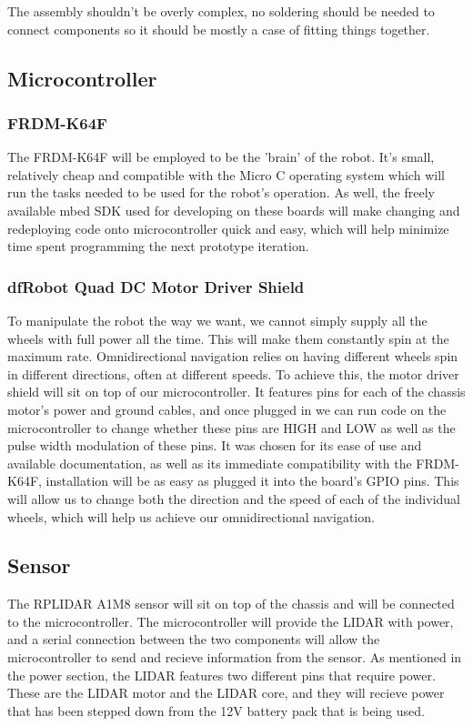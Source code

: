 			The assembly shouldn't be overly complex, no soldering should be needed to connect components so it should be mostly a case of fitting things together.
			
			
			
		\subsection{Microcontroller}
			\subsubsection{FRDM-K64F}
			The FRDM-K64F will be employed to be the 'brain' of the robot. It's small, relatively cheap and compatible with the Micro C operating system which will run the tasks needed to be used for the robot's operation. As well, the freely available mbed SDK used for developing on these boards will make changing and redeploying code onto microcontroller quick and easy, which will help minimize time spent programming the next prototype iteration.
			
			\subsubsection{dfRobot Quad DC Motor Driver Shield}
			To manipulate the robot the way we want, we cannot simply supply all the wheels with full power all the time. This will make them constantly spin at the maximum rate. Omnidirectional navigation relies on having different wheels spin in different directions, often at different speeds. To achieve this, the motor driver shield will sit on top of our microcontroller. It features pins for each of the chassis motor's power and ground cables, and once plugged in we can run code on the microcontroller to change whether these pins are HIGH and LOW as well as the pulse width modulation of these pins. It was chosen for its ease of use and available documentation, as well as its immediate compatibility with the FRDM-K64F, installation will be as easy as plugged it into the board's GPIO pins. This will allow us to change both the direction and the speed of each of the individual wheels, which will help us achieve our omnidirectional navigation.
		
		\subsection{Sensor}
		The RPLIDAR A1M8 sensor will sit on top of the chassis and will be connected to the microcontroller. The microcontroller will provide the LIDAR with power, and a serial connection between the two components will allow the microcontroller to send and recieve information from the sensor. As mentioned in the power section, the LIDAR features two different pins that require power. These are the LIDAR motor and the LIDAR core, and they will recieve power that has been stepped down from the 12V battery pack that is being used.
	
